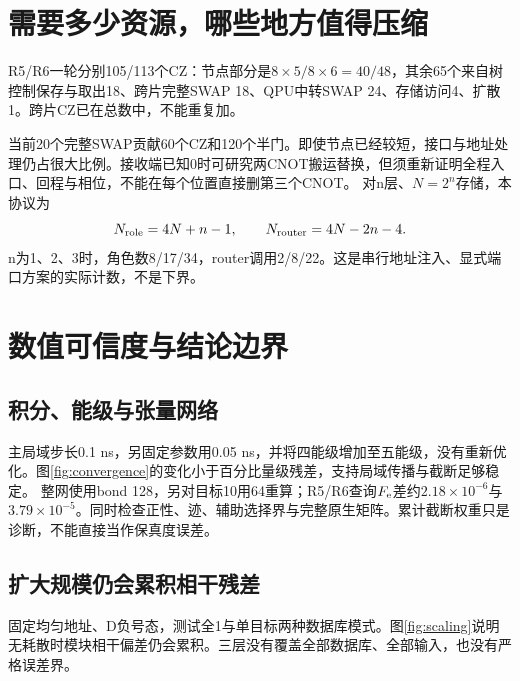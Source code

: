 \section{需要多少资源，哪些地方值得压缩}\label{sec:resource}

R5/R6一轮分别105/113个CZ：节点部分是$8\times5/8\times6=40/48$，其余65个来自树控制保存与取出18、跨片完整SWAP 18、QPU中转SWAP 24、存储访问4、扩散1。跨片CZ已在总数中，不能重复加。

当前20个完整SWAP贡献60个CZ和120个半门。即使节点已经较短，接口与地址处理仍占很大比例。接收端已知0时可研究两CNOT搬运替换，但须重新证明全程入口、回程与相位，不能在每个位置直接删第三个CNOT。
对n层、$N=2^n$存储，本协议为
\begin{equation}
 N_{\rm role}=4N+n-1,\qquad N_{\rm router}=4N-2n-4.
\end{equation}
n为1、2、3时，角色数8/17/34，router调用2/8/22。这是串行地址注入、显式端口方案的实际计数，不是下界。
\FloatBarrier

\section{数值可信度与结论边界}\label{sec:boundary}
\subsection{积分、能级与张量网络}
主局域步长0.1 ns，另固定参数用0.05 ns，并将四能级增加至五能级，没有重新优化。图\ref{fig:convergence}的变化小于百分比量级残差，支持局域传播与截断足够稳定。
整网使用bond 128，另对目标10用64重算；R5/R6查询$F_{\mathrm e}$差约$2.18\times10^{-6}$与$3.79\times10^{-5}$。同时检查正性、迹、辅助选择界与完整原生矩阵。累计截断权重只是诊断，不能直接当作保真度误差。

\subsection{扩大规模仍会累积相干残差}
固定均匀地址、D负号态，测试全1与单目标两种数据库模式。图\ref{fig:scaling}说明无耗散时模块相干偏差仍会累积。三层没有覆盖全部数据库、全部输入，也没有严格误差界。


